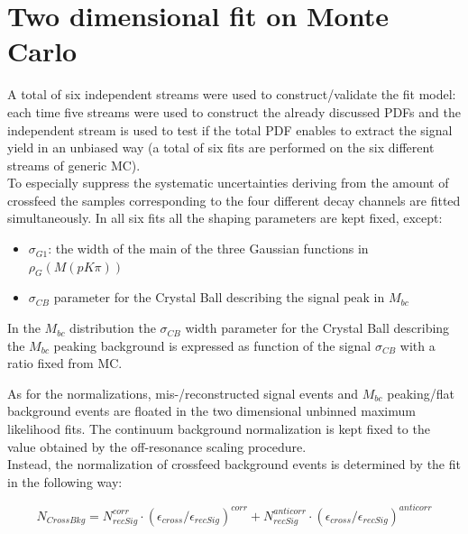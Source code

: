 \newpage

\section{Two dimensional fit on Monte Carlo}\label{MC2D_Fit}

A total of six independent streams were used to construct/validate the fit model: each time five streams were 
used to construct the already discussed PDFs and the independent stream is used to test if the total PDF enables to extract 
the signal yield in an unbiased way (a total of six fits are performed on the six different streams of generic MC).\\
To especially suppress the systematic uncertainties deriving from the amount of crossfeed the samples corresponding to the four
different decay channels are fitted simultaneously.
In all six fits all the shaping parameters are kept fixed, except:
\begin{itemize}
    \item $\sigma_{G1}$: the width of the main of the three Gaussian functions in $\rho_G(M(p K \pi))$
    \item $\sigma_{CB}$ parameter for the Crystal Ball describing the signal peak in $M_{bc}$
\end{itemize}

\noindent In the $M_{bc}$ distribution the $\sigma_{CB}$ width parameter for the Crystal Ball describing the $M_{bc}$ peaking background is expressed as function of the signal $\sigma_{CB}$  with a ratio fixed from MC.

\noindent As for the normalizations, mis-/reconstructed signal events  and  $M_{bc}$ peaking/flat background events are floated in the two dimensional unbinned maximum likelihood fits. 
The continuum background normalization is kept fixed to the value obtained by the off-resonance scaling procedure. \\
Instead, the normalization of crossfeed background events is determined by the fit in the following way:

\begin{equation}
N_{CrossBkg} =  N_{recSig}^{corr} \cdot (\epsilon_{cross}/\epsilon_{recSig})^{corr} + N_{recSig}^{anticorr} \cdot (\epsilon_{cross}/\epsilon_{recSig})^{anticorr}  
\label{eq:paramCrossfeedNorm}
\end{equation}

